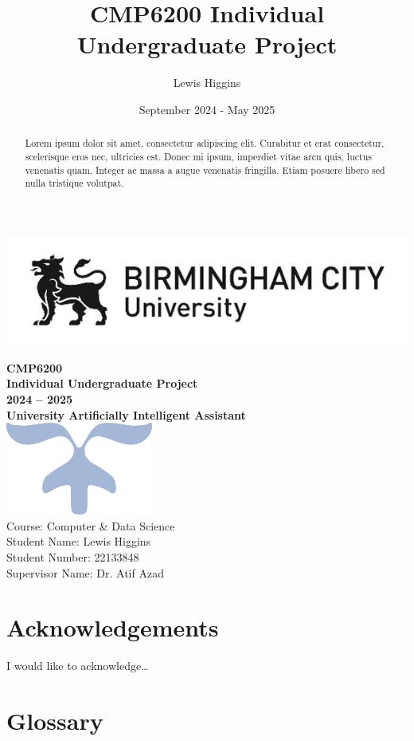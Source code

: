 \documentclass[12pt]{report}
\title{CMP6200 Individual Undergraduate Project}
\author{Lewis Higgins}
\date{September 2024 - May 2025}
\begin{document}
\makeatletter
\begin{titlepage}
    \includegraphics[width=0.3\linewidth]{BCUWide.jpg}\\[4ex]
    \vspace{1cm}
    \begin{center}
        {\huge \bfseries  CMP6200}\\[2ex]
        {\huge \bfseries  Individual Undergraduate Project}\\[2ex]
        {\huge \bfseries 2024 – 2025}\\[16ex]
        {\huge \bfseries University Artificially Intelligent Assistant}\\[6ex]
        \includegraphics[width=0.1\linewidth]{Symbol.png}\\[40ex]
        Course: Computer \& Data Science\\
        Student Name: Lewis Higgins\\
        Student Number: 22133848\\
        Supervisor Name: Dr. Atif Azad
    \end{center}
\end{titlepage}
\makeatother
\thispagestyle{empty}
\newpage



\begin{abstract}
    Lorem ipsum dolor sit amet, consectetur adipiscing elit. Curabitur et erat consectetur, 
    scelerisque eros nec, ultricies est. Donec mi ipsum, imperdiet vitae arcu quis, luctus venenatis quam. 
    Integer ac massa a augue venenatis fringilla. Etiam posuere libero sed nulla tristique volutpat.
\end{abstract}

\setcounter{page}{0}

\chapter*{Acknowledgements}
I would like to acknowledge\dots

\tableofcontents

\chapter*{Glossary}
\end{document}
